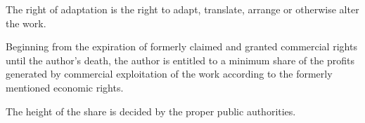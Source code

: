 \begin{contract}
\label{Par:RightOfAdaption}
\Sentence The right of adaptation is the right to adapt, translate, arrange or otherwise 
alter the work.

\label{Par:SubsequentExploitation}
\Sentence Beginning from the expiration of formerly claimed and granted commercial rights until the author's death, the author is entitled to a minimum share of the profits generated by commercial exploitation of the work according to the formerly mentioned economic rights.

\Sentence The height of the share is decided by the proper public authorities.

\end{contract}